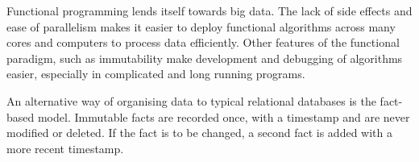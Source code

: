 \documentclass[10pt]{article}
\begin{document}
Functional programming lends itself towards big data. The lack of side effects and ease of parallelism makes it easier to deploy functional algorithms across many cores and computers to process data efficiently. Other features of the functional paradigm, such as immutability make development and debugging of algorithms easier, especially in complicated and long running programs.

An alternative way of organising data to typical relational databases is the fact-based model. Immutable facts are recorded once, with a timestamp and are never modified or deleted. If the fact is to be changed, a second fact is added with a more recent timestamp.
\end{document}
